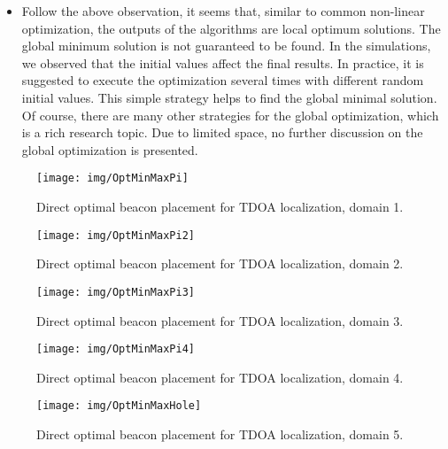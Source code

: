 \begin{itemize}
\item Follow the above observation, it seems that, similar to common non-linear optimization, the outputs of the algorithms are local optimum solutions. The global minimum solution is not guaranteed to be found. In the simulations, we observed that the initial values affect the final results. In practice, it is suggested to execute the optimization several times with different random initial values. This simple strategy helps to find the global minimal solution. Of course, there are many other strategies for the global optimization, which is a rich research topic. Due to limited space, no further discussion on the global optimization is presented.
\end{itemize}





\begin{figure}
  \centering
  \texttt{[image: img/OptMinMaxPi]}\\
  \caption{Direct optimal beacon placement for TDOA localization, domain 1.}\label{f:OptMinMaxPi}
\end{figure}


\begin{figure}
  \centering
  \texttt{[image: img/OptMinMaxPi2]}\\
  \caption{Direct optimal beacon placement for TDOA localization, domain 2.}\label{f:OptMinMaxPi2}
\end{figure}

\begin{figure}
  \centering
  \texttt{[image: img/OptMinMaxPi3]}\\
  \caption{Direct optimal beacon placement for TDOA localization, domain 3.}\label{f:OptMinMaxPi3}
\end{figure}


\begin{figure}
  \centering
  \texttt{[image: img/OptMinMaxPi4]}\\
  \caption{Direct optimal beacon placement for TDOA localization, domain 4.}\label{f:OptMinMaxPi4}
\end{figure}


\begin{figure}
  \centering
  \texttt{[image: img/OptMinMaxHole]}\\
  \caption{Direct optimal beacon placement for TDOA localization, domain 5.}\label{f:OptMinMaxHole}
\end{figure}


